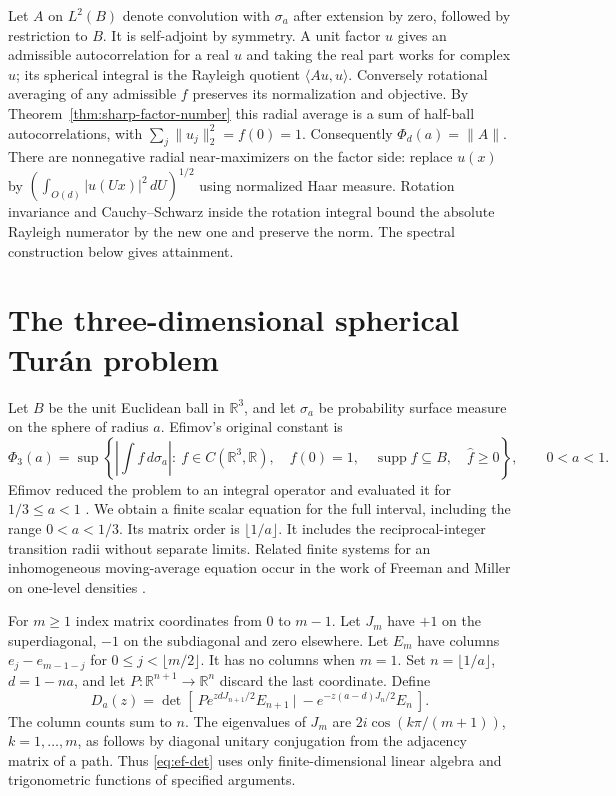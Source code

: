 \documentclass[11pt,a4paper]{article}
\numberwithin{equation}{section}
\begin{document}
Let $A$ on $L^2(B)$ denote convolution with $\sigma_a$ after extension by zero, followed by restriction to $B$. It is self-adjoint by symmetry. A unit factor $u$ gives an admissible autocorrelation for a real $u$ and taking the real part works for complex $u$; its spherical integral is the Rayleigh quotient $\langle Au,u\rangle$. Conversely rotational averaging of any admissible $f$ preserves its normalization and objective. By Theorem~\ref{thm:sharp-factor-number} this radial average is a sum of half-ball autocorrelations, with $\sum_j\|u_j\|_2^2=f(0)=1$. Consequently $\Phi_d(a)=\|A\|$. There are nonnegative radial near-maximizers on the factor side: replace $u(x)$ by $(\int_{O(d)}|u(Ux)|^2\,dU)^{1/2}$ using normalized Haar measure. Rotation invariance and Cauchy--Schwarz inside the rotation integral bound the absolute Rayleigh numerator by the new one and preserve the norm. The spectral construction below gives attainment.

\section{The three-dimensional spherical Tur\'an problem}
\label{sec:efimov}
Let $B$ be the unit Euclidean ball in $\mathbb R^3$, and let $\sigma_a$ be probability surface measure on the sphere of radius $a$. Efimov's original constant is
\[
 \Phi_3(a)=\sup\left\{\left|\int f\,d\sigma_a\right|:\ f\in C(\mathbb R^3,\mathbb R),\quad
 f(0)=1,\quad \operatorname{supp}f\subseteq B,\quad \widehat f\ge0\right\},\qquad 0<a<1.
\]
Efimov reduced the problem to an integral operator and evaluated it for $1/3\le a<1$ \cite[Theorems 3--5]{EfimovSphere}. We obtain a finite scalar equation for the full interval, including the range $0<a<1/3$. Its matrix order is $\lfloor 1/a\rfloor$. It includes the reciprocal-integer transition radii without separate limits. Related finite systems for an inhomogeneous moving-average equation occur in the work of Freeman and Miller on one-level densities \cite{Freeman}.

For $m\ge1$ index matrix coordinates from $0$ to $m-1$. Let $J_m$ have $+1$ on the superdiagonal, $-1$ on the subdiagonal and zero elsewhere. Let $E_m$ have columns $e_j-e_{m-1-j}$ for $0\le j<\lfloor m/2\rfloor$. It has no columns when $m=1$. Set $n=\lfloor 1/a\rfloor$, $d=1-na$, and let $P:\mathbb R^{n+1}\to\mathbb R^n$ discard the last coordinate. Define
\begin{equation}
 D_a(z)=\det\!\left[\ P e^{zdJ_{n+1}/2} E_{n+1}\ \big|\ -e^{-z(a-d)J_n/2} E_n\ \right].
 \label{eq:ef-det}
\end{equation}
The column counts sum to $n$. The eigenvalues of $J_m$ are $2i\cos(k\pi/(m+1))$, $k=1,\ldots,m$, as follows by diagonal unitary conjugation from the adjacency matrix of a path. Thus \eqref{eq:ef-det} uses only finite-dimensional linear algebra and trigonometric functions of specified arguments.
\end{document}
